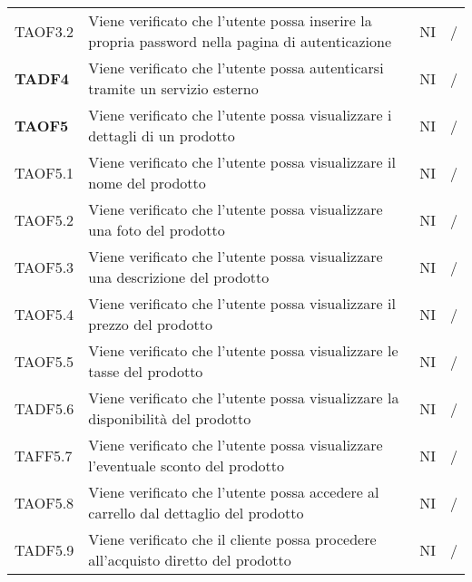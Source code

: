 \begin{center}
\begin{longtable}[!h]{p{60px} p{240px} p{35px} p{35px}}
        TAOF3.2         & Viene verificato che l'utente possa inserire la propria password nella pagina di autenticazione                     & NI              & /              \\
        \textbf{TADF4}  & Viene verificato che l'utente possa autenticarsi tramite un servizio esterno                                        & NI             & /              \\
        \textbf{TAOF5}  & Viene verificato che l'utente possa visualizzare i dettagli di un prodotto                                          & NI              & /              \\
        TAOF5.1         & Viene verificato che l'utente possa visualizzare il nome del prodotto                                               & NI              & /              \\
        TAOF5.2         & Viene verificato che l'utente possa visualizzare una foto del prodotto                                              & NI              & /              \\
        TAOF5.3         & Viene verificato che l'utente possa visualizzare una descrizione del prodotto                                       & NI              & /              \\
        TAOF5.4         & Viene verificato che l'utente possa visualizzare il prezzo del prodotto                                             & NI              & /              \\
        TAOF5.5         & Viene verificato che l'utente possa visualizzare le tasse del prodotto                                              & NI              & /              \\
        TADF5.6         & Viene verificato che l'utente possa visualizzare la disponibilità del prodotto                                      & NI              & /              \\
        TAFF5.7         & Viene verificato che l'utente possa visualizzare l'eventuale sconto del prodotto                                    & NI              & /              \\
        TAOF5.8         & Viene verificato che l'utente possa accedere al carrello dal dettaglio del prodotto                                 & NI              & /              \\
        TADF5.9         & Viene verificato che il cliente possa procedere all'acquisto diretto del prodotto                                   & NI             & /              \\

\end{longtable}
\end{center}
